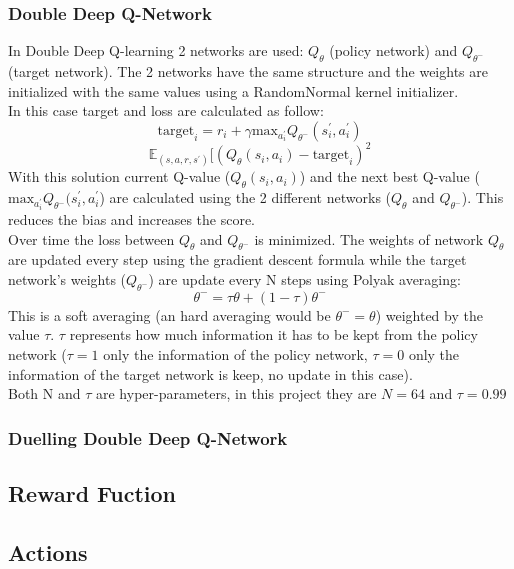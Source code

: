 \documentclass[14pt]{extarticle}
\def\sp{\vspace{5pt}}
\begin{document}
\begin{flushleft}
	\subsubsection{Double Deep Q-Network}
	\sp
	In Double Deep Q-learning 2 networks are used: $Q_{\theta}$ (policy network) and $Q_{\theta^{-}}$ (target network). The 2 networks have the same structure and the weights are initialized with the same values using a RandomNormal kernel initializer. \\
	In this case target and loss are calculated as follow:
	\[
\text{target}_i = r_i + \gamma\text{max}_{a_i^\prime}Q_{\theta^{-}}(s_i^{\prime},a_i^{\prime})
\]
\[\mathbb{E}_{(s,a,r,s^\prime)}[(Q_{\theta}(s_i,a_i) - \text{target}_i)^2\] 
With this solution current Q-value ($Q_{\theta}(s_i,a_i)$) and the next best Q-value ($\text{max}_{a_i^\prime}Q_{\theta^{-}}(s_i^{\prime},a_i^{\prime}$) are calculated using the 2 different networks ($Q_{\theta}$ and $Q_{\theta^{-}}$). This reduces the bias and increases the score.
\\
Over time the loss between $Q_{\theta}$ and $Q_{\theta^{-}}$ is minimized. The weights of network $Q_{\theta}$ are updated every step using the gradient descent formula while the target network's weights ($Q_{\theta^{-}}$) are update every N steps using Polyak averaging: 
\[ \theta^{-} = \tau\theta + (1-\tau)\theta^{-} \]
This is a soft averaging (an hard averaging would be $\theta^{-}=\theta$) weighted by the value $\tau$. $\tau$ represents how much information it has to be kept from the policy network ($\tau=1$ only the information of the policy network, $\tau=0$ only the information of the target network is keep, no update in this case). \cite{DDQN}
\\
Both N and $\tau$ are hyper-parameters, in this project they are $N=64$ and $\tau=0.99$

	\subsubsection{Duelling Double Deep Q-Network}
	\sp
	
	
	\subsection{Reward Fuction} \label{rewardfuc}
	\sp
	\subsection{Actions}
	\sp

\end{flushleft}
\end{document}
